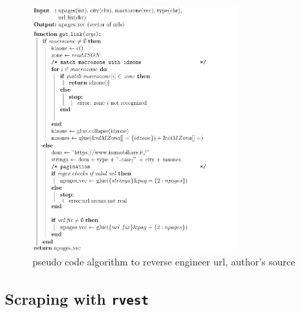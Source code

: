 \documentclass[
  12pt,
  a4paper,
  oneside]{book}
\theoremstyle{definition}
\theoremstyle{definition}
\theoremstyle{definition}
\theoremstyle{remark}
\begin{document}
\begin{figure}
\centering
\includegraphics[width=0.7\textwidth,height=\textheight]{images/pseudocode_latex/pseudocode_get_link.jpg}
\caption{\label{fig:pseudocode3}pseudo code algorithm to reverse engineer url, author's source}
\end{figure}

\hypertarget{scraping-with-rvest}{%
\subsection{\texorpdfstring{Scraping with \texttt{rvest}}{Scraping with rvest}}\label{scraping-with-rvest}}
\end{document}
